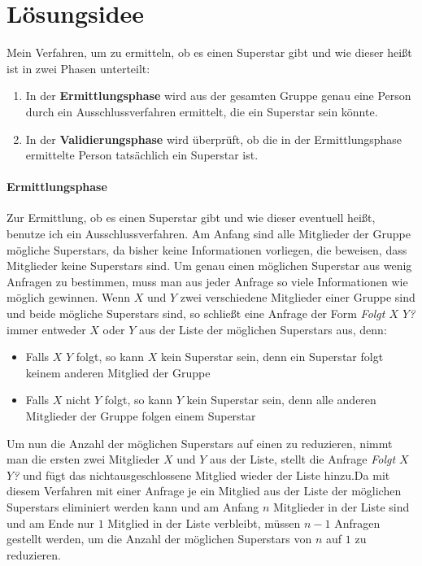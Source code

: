 \documentclass[a4paper,10pt,ngerman]{scrartcl}
\title{\Aufgabe}
\author{\Name\\Team-ID: \TeamId}
\date{\today}
\begin{document}
\maketitle
\tableofcontents
\clearpage

\section{Lösungsidee}
Mein Verfahren, um zu ermitteln, ob es einen Superstar gibt und wie dieser heißt ist in zwei Phasen unterteilt:
\begin{enumerate}
\item In der \textbf{Ermittlungsphase} wird aus der gesamten Gruppe genau eine Person durch ein Ausschlussverfahren ermittelt, die ein Superstar sein könnte. 
\item In der \textbf{Validierungsphase} wird überprüft, ob die in der Ermittlungsphase ermittelte Person tatsächlich ein Superstar ist.
\end{enumerate}

\paragraph{Ermittlungsphase}
Zur Ermittlung, ob es einen Superstar gibt und wie dieser eventuell heißt, benutze ich ein Ausschlussverfahren. Am Anfang sind alle Mitglieder der Gruppe mögliche Superstars, da bisher keine Informationen vorliegen, die beweisen, dass Mitglieder keine Superstars sind. Um genau einen möglichen Superstar aus wenig Anfragen zu bestimmen, muss man aus jeder Anfrage so viele Informationen wie möglich gewinnen. Wenn $X$ und $Y$ zwei verschiedene Mitglieder einer Gruppe sind und beide mögliche Superstars sind, so schließt eine Anfrage der Form \textit{Folgt $X$ $Y$?} immer entweder $X$ oder $Y$ aus der Liste der möglichen Superstars aus, denn:
\begin{itemize}
  \item Falls $X$ $Y$ folgt, so kann $X$ kein Superstar sein, denn ein Superstar folgt keinem anderen Mitglied der Gruppe
  \item Falls $X$ nicht $Y$ folgt, so kann $Y$ kein Superstar sein, denn alle anderen Mitglieder der Gruppe folgen einem Superstar
\end{itemize}
Um nun die Anzahl der möglichen Superstars auf einen zu reduzieren, nimmt man die ersten zwei Mitglieder $X$ und $Y$ aus der Liste, stellt die Anfrage \textit{Folgt $X$ $Y$?} und fügt das nichtausgeschlossene Mitglied wieder der Liste hinzu.\newline Da mit diesem Verfahren mit einer Anfrage je ein Mitglied aus der Liste der möglichen Superstars eliminiert werden kann und am Anfang $n$ Mitglieder in der Liste sind und am Ende nur $1$ Mitglied in der Liste verbleibt, müssen $n-1$ Anfragen gestellt werden, um die Anzahl der möglichen Superstars von $n$ auf $1$ zu reduzieren.
\end{document}
